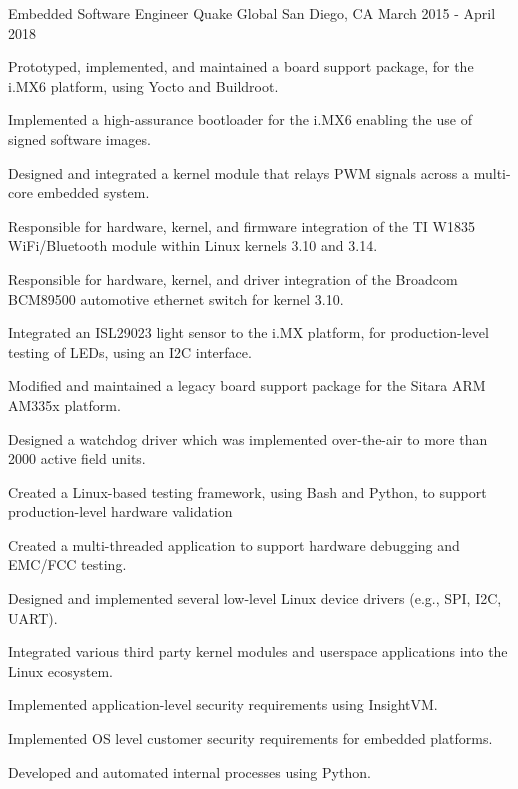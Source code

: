 

\begin{cventries}

  \cventry
    {Embedded Software Engineer} %
    {Quake Global} %
    {San Diego, CA} %
    {March 2015 - April 2018} %
    {
      \begin{cvitems} %
      \item Prototyped, implemented, and maintained a board support package, for the i.MX6 platform, using Yocto and Buildroot.
      \item Implemented a high-assurance bootloader for the i.MX6 enabling the use of signed software images.
      \item Designed and integrated a kernel module that relays PWM signals across a multi-core embedded system.
      \item Responsible for hardware, kernel, and firmware integration of the TI W1835 WiFi/Bluetooth module within Linux kernels 3.10 and 3.14.
      \item Responsible for hardware, kernel, and driver integration of the Broadcom BCM89500 automotive ethernet switch for kernel 3.10. 
      \item Integrated an ISL29023 light sensor to the i.MX platform, for production-level testing of LEDs, using an I2C interface. 
      \item Modified and maintained a legacy board support package for the Sitara ARM AM335x platform.
      \item Designed a watchdog driver which was implemented over-the-air to more than 2000 active field units.
      \item Created a Linux-based testing framework, using Bash and Python, to support production-level \newline hardware validation
      \item Created a multi-threaded application to support hardware debugging and EMC/FCC testing.
      \item Designed and implemented several low-level Linux device drivers (e.g., SPI, I2C, UART).
      \item Integrated various third party kernel modules and userspace applications into the Linux ecosystem.
      \item Implemented application-level security requirements using InsightVM.
      \item Implemented OS level customer security requirements for embedded platforms.
      \item Developed and automated internal processes using Python. 
      \end{cvitems}
    }


\end{cventries}
